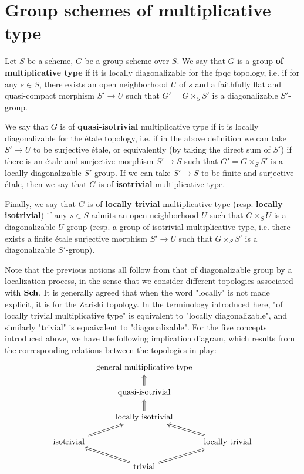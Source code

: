 \section{Group schemes of multiplicative type}
\begin{definition}
Let $S$ be a scheme, $G$ be a group scheme over $S$. We say that $G$ is a group \textbf{of multiplicative type} if it is locally diagonalizable for the fpqc topology, i.e. if for any $s\in S$, there exists an open neighborhood $U$ of $s$ and a faithfully flat and quasi-compact morphism $S'\to U$ such that $G'=G\times_SS'$ is a diagonalizable $S'$-group.\par
We say that $G$ is of \textbf{quasi-isotrivial} multiplicative type if it is locally diagonalizable for the \'etale topology, i.e. if in the above definition we can take $S'\to U$ to be surjective \'etale, or equivalently (by taking the direct sum of $S'$) if there is an \'etale and surjective morphism $S'\to S$ such that $G'=G\times_SS'$ is a locally diagonalizable $S'$-group. If we can take $S'\to S$ to be finite and surjective \'etale, then we say that $G$ is of \textbf{isotrivial} multiplicative type.\par
Finally, we say that $G$ is of \textbf{locally trivial} multiplicative type (resp. \textbf{locally isotrivial}) if any $s\in S$ admits an open neighborhood $U$ such that $G\times_SU$ is a diagonalizable $U$-group (resp. a group of isotrivial multiplicative type, i.e. there exists a finite \'etale surjective morphism $S'\to U$ such that $G\times_SS'$ is a diagonalizable $S'$-group).
\end{definition}
Note that the previous notions all follow from that of diagonalizable group by a localization process, in the sense that we consider different topologies associated with $\mathbf{Sch}$. It is generally agreed that when the word "locally" is not made explicit, it is for the Zariski topology. In the terminology introduced here, "of locally trivial multiplicative type" is equivalent to "locally diagonalizable", and similarly "trivial" is equaivalent to "diagonalizable". For the five concepts introduced above, we have the following implication diagram, which results from the corresponding relations between the topologies in play:
\[\begin{tikzcd}[row sep=5mm,column sep=2mm]
&\text{general multiplicative type}&\\
&\text{quasi-isotrivial}\ar[u,Rightarrow]&\\
&\text{locally isotrivial}\ar[u,Rightarrow]&\\
\text{isotrivial}\ar[ru,Rightarrow]&&\text{locally trivial}\ar[lu,Rightarrow]\\
&\text{trivial}\ar[lu,Rightarrow]\ar[ru,Rightarrow]&
\end{tikzcd}\]

